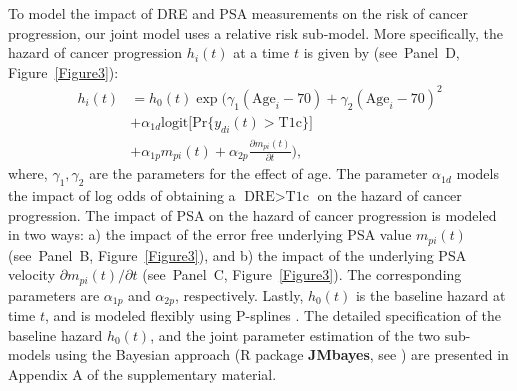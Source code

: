 \documentclass[a4paper, 12pt]{article}
\begin{document}
To model the impact of DRE and PSA measurements on the risk of cancer progression, our joint model uses a relative risk sub-model. More specifically, the hazard of cancer progression $h_i(t)$ at a time $t$ is given by (see~Panel~D, Figure~\ref{Figure3}):
\begin{equation}
\label{eq:rel_risk_model}
\begin{split}
    h_i(t) &= h_0(t) \exp\Big(\gamma_1 (\mbox{Age}_i-70) + \gamma_2 (\mbox{Age}_i-70)^2\\
    &+\alpha_{1d} \mbox{logit} \big[\mbox{Pr}\{y_{di}(t) > \mbox{T1c}\}\big]\\&+ \alpha_{1p} m_{pi}(t) + \alpha_{2p} \frac{\partial m_{pi}(t)}{\partial {t}}\Big),
    \end{split}
\end{equation}
where, $\gamma_1, \gamma_2$ are the parameters for the effect of age. The parameter $\alpha_{1d}$ models the impact of log odds of obtaining a $\mbox{DRE} > \mbox{T1c}$ on the hazard of cancer progression. The impact of PSA on the hazard of cancer progression is modeled in two ways: a) the impact of the error free underlying PSA value $m_{pi}(t)$ (see~Panel~B, Figure~\ref{Figure3}), and b) the impact of the underlying PSA velocity $\partial m_{pi}(t)/\partial {t}$ (see~Panel~C, Figure~\ref{Figure3}). The corresponding parameters are $\alpha_{1p}$ and $\alpha_{2p}$, respectively. Lastly, $h_0(t)$ is the baseline hazard at time $t$, and is modeled flexibly using P-splines \citep{eilers1996flexible}. The detailed specification of the baseline hazard $h_0(t)$, and the joint parameter estimation of the two sub-models using the Bayesian approach (R package \textbf{JMbayes}, see \cite{rizopoulosJMbayes}) are presented in Appendix A of the supplementary material.
\end{document}
